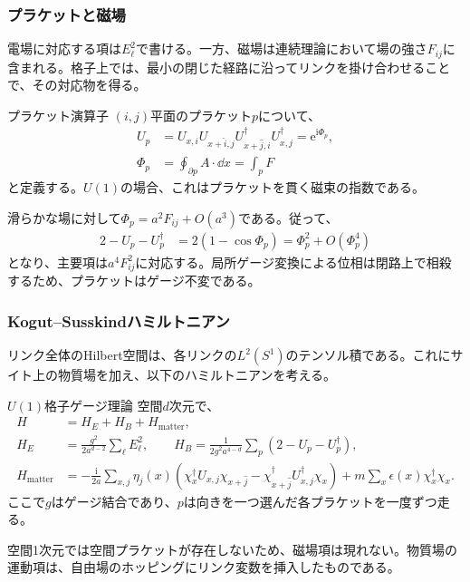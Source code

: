 \documentclass[a4paper,10.5pt]{article}
\numberwithin{equation}{section}
\providecommand{\ii}{\mathrm{i}}
\providecommand{\ee}{\mathrm{e}}
\begin{document}
\subsubsection{プラケットと磁場}
電場に対応する項は$E_\ell^2$で書ける。一方、磁場は連続理論において場の強さ$F_{ij}$に含まれる。格子上では、最小の閉じた経路に沿ってリンクを掛け合わせることで、その対応物を得る。
\begin{defbox}{プラケット演算子}
$(i,j)$平面のプラケット$p$について、
\begin{align}
U_p&=U_{x,i}U_{x+\hat i,j}U^\dagger_{x+\hat j,i}U^\dagger_{x,j}
=\ee^{\ii\Phi_p},\\
\Phi_p&=\oint_{\partial p}A\cdot\dd x
=\int_p F
\end{align}
と定義する。$U(1)$の場合、これはプラケットを貫く磁束の指数である。
\end{defbox}
\begin{center}
\end{center}
滑らかな場に対して$\Phi_p=a^2F_{ij}+O(a^3)$である。従って、
\begin{align}
2-U_p-U_p^\dagger
&=2(1-\cos\Phi_p)=\Phi_p^2+O(\Phi_p^4)
\end{align}
となり、主要項は$a^4F_{ij}^2$に対応する。局所ゲージ変換による位相は閉路上で相殺するため、プラケットはゲージ不変である。

\subsubsection{Kogut--Susskindハミルトニアン}
リンク全体のHilbert空間は、各リンクの$L^2(S^1)$のテンソル積である。これにサイト上の物質場を加え、以下のハミルトニアンを考える。
\begin{defbox}{$U(1)$格子ゲージ理論}
空間$d$次元で、
\begin{align}
H&=H_E+H_B+H_{\mathrm{matter}},\\
H_E&=\frac{g^2}{2a^{d-2}}\sum_\ell E_\ell^2,\qquad
H_B=\frac1{2g^2a^{4-d}}\sum_p(2-U_p-U_p^\dagger),\\
H_{\mathrm{matter}}
&=-\frac{\ii}{2a}\sum_{x,j}\eta_j(x)
\left(\chi_x^\dagger U_{x,j}\chi_{x+\hat j}
-\chi_{x+\hat j}^\dagger U_{x,j}^\dagger\chi_x\right)
+m\sum_x\epsilon(x)\chi_x^\dagger\chi_x.
\label{eq:ks}
\end{align}
ここで$g$はゲージ結合であり、$p$は向きを一つ選んだ各プラケットを一度ずつ走る。
\end{defbox}
空間1次元では空間プラケットが存在しないため、磁場項は現れない。物質場の運動項は、自由場のホッピングにリンク変数を挿入したものである。
\end{document}
